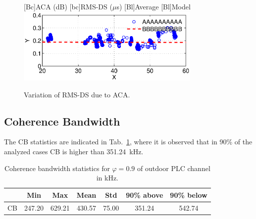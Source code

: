 \documentclass[journal]{IEEEtran}
\newcommand{\tamfig}{3.5in}    %
\begin{document}
\begin{figure}[!htp]
\begin{centering}
    [Bc]{ACA (dB)}    
    [bc]{RMS-DS ($\mu$s)}
    [Bl]{Average}
    [Bl]{Model}
    \includegraphics[width=\tamfig]{Figuras/ACGxRMSDS.eps}
    \caption{Variation of RMS-DS due to ACA.}
    \label{Fig:ACMxRMSDS}
\end{centering}
\end{figure}

\subsection{Coherence Bandwidth}\label{sec-bandadecoerencia}

The \ac{CB} statistics are indicated in Tab.~\ref{Tab:EstatisticasCB}, where it is observed that in 90\% of the analyzed cases  \ac{CB} is higher than 351.24~kHz.
\begin{table}[!htb]
\centering
\caption{Coherence bandwidth statistics for $\varphi = 0.9$ of outdoor PLC channel in kHz.}
\footnotesize 
\begin{tabular}{c|c|c|c|c|c|c}
\hline 
                  &  Min    & Max    & Mean    & Std     & 90\% above   & 90\% below \\
\hline 
CB                & 247.20  & 629.21 &  430.57 & 75.00   & 351.24       & 542.74 \\
\hline
\end{tabular} \label{Tab:EstatisticasCB}
\newline
\end{table} 
\end{document}
